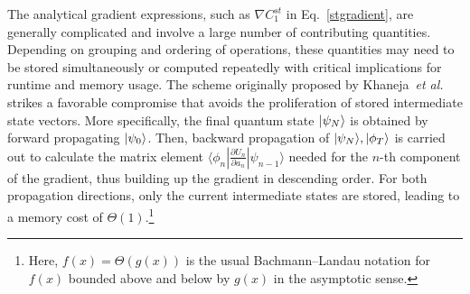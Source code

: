 The analytical gradient expressions, such as $\nabla C_1^{st}$ in Eq.\ \eqref{stgradient}, are generally complicated and involve a large number of contributing quantities. Depending on grouping and ordering of operations, these quantities may need to be stored simultaneously or computed repeatedly with critical implications for runtime and memory usage. The scheme originally proposed by Khaneja\ \textit{et al.}\ \cite{nmrkhaneja2005optimal} strikes a favorable compromise that avoids the proliferation of stored intermediate state vectors. More specifically, the final quantum state $|\psi_N\rangle$ is obtained by forward propagating $|\psi_0\rangle$. Then, backward propagation of $|\psi_N\rangle,|\phi_T\rangle$ is carried out to calculate the matrix element $\langle\phi_{n}|\frac {\partial U_n }{\partial a_{n}}|\psi_{n-1}\rangle$ needed for the $n$-th component of the gradient, thus building up the gradient in descending order. For both propagation directions, only the current intermediate states are stored, leading to a memory cost of $\Theta(1)$.\footnote{Here, $f(x)=\Theta
(g(x))$ is the usual Bachmann–Landau notation for $f(x)$ bounded above and below by $g(x)$ in the asymptotic sense.}

